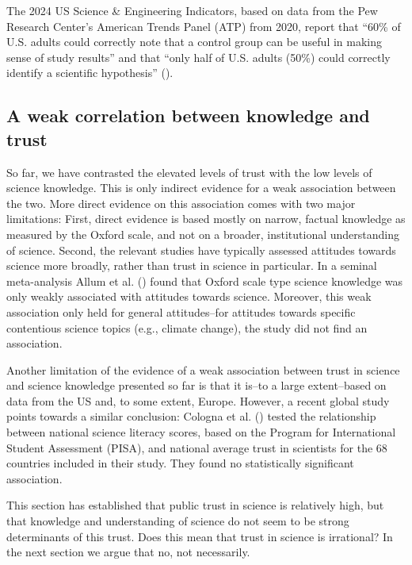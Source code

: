 \documentclass[
  jou,
  floatsintext,
  longtable,
  nolmodern,
  notxfonts,
  notimes,
  colorlinks=true,linkcolor=blue,citecolor=blue,urlcolor=blue]{apa7}
\begin{document}
The 2024 US Science \& Engineering Indicators, based on data from the
Pew Research Center's American Trends Panel (ATP) from 2020, report that
``60\% of U.S. adults could correctly note that a control group can be
useful in making sense of study results'' and that ``only half of U.S.
adults (50\%) could correctly identify a scientific hypothesis''
().

\subsection{A weak correlation between knowledge and
trust}\label{a-weak-correlation-between-knowledge-and-trust}

So far, we have contrasted the elevated levels of trust with the low
levels of science knowledge. This is only indirect evidence for a weak
association between the two. More direct evidence on this association
comes with two major limitations: First, direct evidence is based mostly
on narrow, factual knowledge as measured by the Oxford scale, and not on
a broader, institutional understanding of science. Second, the relevant
studies have typically assessed attitudes towards science more broadly,
rather than trust in science in particular. In a seminal meta-analysis
Allum et al. ()
found that Oxford scale type science knowledge was only weakly
associated with attitudes towards science. Moreover, this weak
association only held for general attitudes--for attitudes towards
specific contentious science topics (e.g., climate change), the study
did not find an association.

Another limitation of the evidence of a weak association between trust
in science and science knowledge presented so far is that it is--to a
large extent--based on data from the US and, to some extent, Europe.
However, a recent global study points towards a similar conclusion:
Cologna et al. ()
tested the relationship between national science literacy scores, based
on the Program for International Student Assessment (PISA), and national
average trust in scientists for the 68 countries included in their
study. They found no statistically significant association.

This section has established that public trust in science is relatively
high, but that knowledge and understanding of science do not seem to be
strong determinants of this trust. Does this mean that trust in science
is irrational? In the next section we argue that no, not necessarily.
\end{document}
